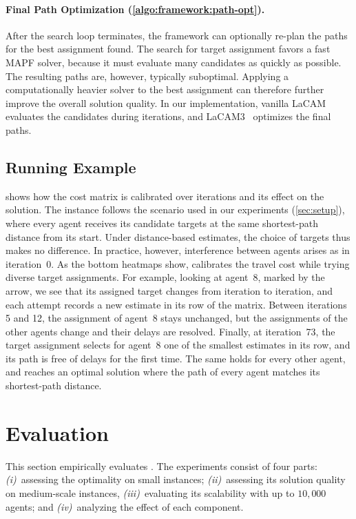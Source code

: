 \paragraph{Final Path Optimization (\cref{algo:framework:path-opt}).}
After the search loop terminates, the framework can optionally re-plan the paths for the best assignment found.
The search for target assignment favors a fast MAPF solver, because it must evaluate many candidates as quickly as possible.
The resulting paths are, however, typically suboptimal.
Applying a computationally heavier solver to the best assignment can therefore further improve the overall solution quality.
In our implementation, vanilla LaCAM~\cite{okumura2023lacam} evaluates the candidates during iterations, and LaCAM3~\cite{okumura2024lacamstar} optimizes the final paths.


\subsection{Running Example}
 shows how the cost matrix is calibrated over iterations and its effect on the solution.
The instance follows the \scenEqdist scenario used in our experiments (\cref{sec:setup}), where every agent receives its candidate targets at the same shortest-path distance from its start.
Under distance-based estimates, the choice of targets thus makes no difference.
In practice, however, interference between agents arises as in iteration~0.
As the bottom heatmaps show, \planner calibrates the travel cost while trying diverse target assignments.
For example, looking at agent~8, marked by the arrow, we see that its assigned target changes from iteration to iteration, and each attempt records a new estimate in its row of the matrix.
Between iterations 5 and 12, the assignment of agent~8 stays unchanged, but the assignments of the other agents change and their delays are resolved.
Finally, at iteration~73, the target assignment selects for agent~8 one of the smallest estimates in its row, and its path is free of delays for the first time.
The same holds for every other agent, and \planner reaches an optimal solution where the path of every agent matches its shortest-path distance.

\section{Evaluation}
This section empirically evaluates \planner.
The experiments consist of four parts:
\emph{(i)}~assessing the optimality on small instances;
\emph{(ii)}~assessing its solution quality on medium-scale instances,
\emph{(iii)}~evaluating its scalability with up to $10{,}000$ agents; and
\emph{(iv)}~analyzing the effect of each component.

